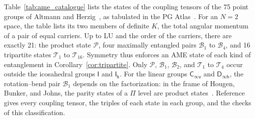 \documentclass[
  reprint,
  aps,
  prx,
  superscriptaddress,
  amsmath,
  amssymb,
  longbibliography
]{revtex4-2}
\newcommand{\grp}[1]{\mathsf{#1}}
\DeclareRobustCommand{\pgatlasfont}[1]{{\fontencoding{OT1}\fontfamily{cmss}\fontshape{n}\selectfont#1}}
\newcommand{\PGAtlas}{\pgatlasfont{PG Atlas}}
\newcommand{\catP}{\mathcal{P}}
\newcommand{\catB}[1]{\mathcal{B}_{#1}}
\newcommand{\catT}[1]{\mathcal{T}_{#1}}
\begin{document}
Table~\ref{tab:ame_catalogue} lists the states of the coupling tensors of the 75 point groups of Altmann and Herzig~\cite{AltmannHerzig2011}, as tabulated in the \PGAtlas~\cite{o3harmonics}. For an $N=2$ space, the table lists its two members of definite $K$, the total angular momentum of a pair of equal carriers. Up to LU and the order of the carriers, there are exactly 21: the product state $\catP$, four maximally entangled pairs $\catB{1}$ to $\catB{4}$, and 16 tripartite states $\catT{1}$ to $\catT{16}$. Symmetry thus enforces an AME state of each kind of entanglement in Corollary~\ref{cor:tripartite}. Only $\catP$, $\catB{1}$, $\catB{2}$, and $\catT{1}$ to $\catT{4}$ occur outside the icosahedral groups $\grp{I}$ and $\grp{I_{h}}$. For the linear groups $\grp{C_{\infty v}}$ and $\grp{D_{\infty h}}$, the rotation--bend pair $\catB{1}$ depends on the factorization: in the frame of Hougen, Bunker, and Johns, the parity states of a $\Pi$ level are product states~\cite{HougenBunkerJohns1970}. Reference~\cite{DasRepo2026} gives every coupling tensor, the triples of each state in each group, and the checks of this classification.
\end{document}
